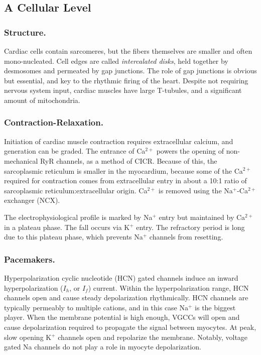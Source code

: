 \documentclass[12pt]{report}
\begin{document}
\subsection{A Cellular Level}

\subsubsection{Structure.}
Cardiac cells contain sarcomeres, but the fibers themselves are smaller and often mono-nucleated. Cell edges are called \textit{intercalated disks}, held together by desmosomes and permeated by gap junctions. The role of gap junctions is obvious but essential, and key to the rhythmic firing of the heart. Despite not requiring nervous system input, cardiac muscles have large T-tubules, and a significant amount of mitochondria. 

\subsubsection{Contraction-Relaxation.} 

Initiation of cardiac muscle contraction requires extracellular calcium, and generation can be graded. The entrance of Ca$^{2+}$ powers the opening of non-mechanical RyR channels, as a method of CICR. Because of this, the sarcoplasmic reticulum is smaller in the myocardium, because some of the Ca$^{2+}$ required for contraction comes from extracellular entry in about a 10:1 ratio of sarcoplasmic reticulum:extracellular origin. Ca$^{2+}$ is removed using the Na$^+$-Ca$^{2+}$ exchanger (NCX).\newline

The electrophysiological profile is marked by Na$^+$ entry but maintained by Ca$^{2+}$ in a plateau phase. The fall occurs via K$^+$ entry. The refractory period is long due to this plateau phase, which prevents Na$^+$ channels from resetting. 

\subsubsection{Pacemakers.}
Hyperpolarization cyclic nucleotide (HCN) gated channels induce an inward hyperpolarization ($I_h$, or $I_f$) current. Within the hyperpolarization range, HCN channels open and cause steady depolarization rhythmically. HCN channels are typically permeably to multiple cations, and in this case Na$^+$ is the biggest player. When the membrane potential is high enough, VGCCs will open and cause depolarization required to propagate the signal between myocytes. At peak, slow opening K$^+$ channels open and repolarize the membrane. Notably, voltage gated Na channels do not play a role in myocyte depolarization. \newline
\end{document}
